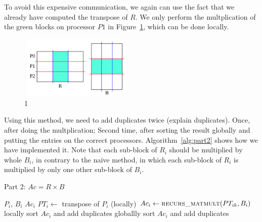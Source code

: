 To avoid this expensive communication, we again can use the fact that we already have computed the transpose of $R$. We only perform the multplication of the green blocks on processor $P1$ in Figure~\ref{fig:part2e}, which can be done locally.

\begin{figure}[tbh]
 \centering
 \includegraphics[width=5.5cm,height=3cm]{./figures/part2e.pdf}
 \caption{1}
 \label{fig:part2e}
\end{figure}

Using this method, we need to add duplicates twice (explain duplicates). Once, after doing the multplication; Second time, after sorting the result globally and putting the entries on the correct processors. Algorithm~\ref{alg:part2} shows how we have implemented it. Note that each sub-block of $R_i$ should be multiplied by whole $B_i$, in contrary to the naive method, in which each sub-block of $R_i$ is multiplied by only one other sub-block of $B_i$.

\begin{algorithm}[H] 
  \caption{Part 2: $Ac = R \times B$} \label{alg:part2} 
  \begin{algorithmic}[1]
    \Require $P_i$, $B_i$
    \Ensure  $Ac_i$
    \State $PT_i \leftarrow$ transpose of $P_i$ (locally)
      \State $Ac_i \leftarrow \textsc{recurs\_matmult}(PT_{ik}, B_i)$
    \EndFor
    \State locally sort $Ac_i$ and add duplicates
    \State globallly sort $Ac_i$ and add duplicates
  \end{algorithmic}
\end{algorithm}

